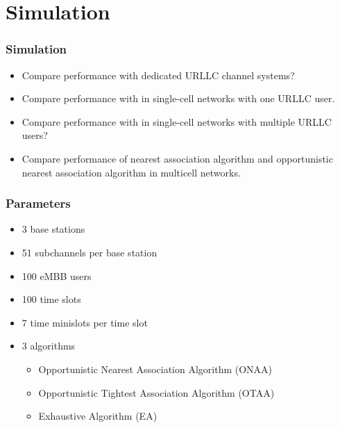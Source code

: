 \section{Simulation}
\begin{frame}
  \frametitle{Simulation}
  \begin{itemize}
    \item Compare performance with dedicated URLLC channel systems?
    \item Compare performance with \cite{AVS20} in single-cell networks with one URLLC user.
    \item Compare performance with \cite{YZR21} in single-cell networks with multiple URLLC users?
    \item Compare performance of nearest association algorithm and opportunistic nearest association algorithm in multicell networks.
  \end{itemize}
\end{frame}

\begin{frame}
  \frametitle{Parameters}
  \begin{itemize}
    \item 3 base stations
    \item 51 subchannels per base station
    \item 100 eMBB users
    \item 100 time slots
    \item 7 time minislots per time slot
    \item 3 algorithms
      \begin{itemize}
        \item Opportunistic Nearest Association Algorithm (ONAA)
        \item Opportunistic Tightest Association Algorithm (OTAA)
        \item Exhaustive Algorithm (EA)
      \end{itemize}
  \end{itemize}
\end{frame}

